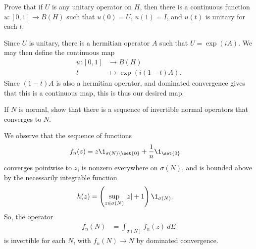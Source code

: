 \documentclass[10pt]{mypackage}
\begin{document}
\begin{problem}
  Prove that if $U$ is any unitary operator on $H$, then there is a continuous function $u\colon [0,1]\rightarrow B(H)$ such that $u(0) = U$, $u(1) = I$, and $u(t)$ is unitary for each $t$.
\end{problem}
\begin{solution}
  Since $U$ is unitary, there is a hermitian operator $A$ such that $U = \exp(iA)$. We may then define the continuous map
  \begin{align*}
    u\colon [0,1] &\rightarrow B(H)\\
    t &\mapsto \exp\left( i\left( 1-t \right)A \right).
  \end{align*}
  Since $\left( 1-t \right)A$ is also a hermitian operator, and dominated convergence gives that this is a continuous map, this is thus our desired map.
\end{solution}
\begin{problem}
  If $N$ is normal, show that there is a sequence of invertible normal operators that converges to $N$.
\end{problem}
\begin{solution}
  We observe that the sequence of functions
  \begin{align*}
    f_n(z) &= z\1_{\sigma(N)\setminus \set{0}} + \frac{1}{n}\1_{\set{0}}
  \end{align*}
  converges pointwise to $z$, is nonzero everywhere on $\sigma(N)$, and is bounded above by the necessarily integrable function
  \begin{align*}
    h(z) &= \left( \sup_{z\in \sigma(N)}\left\vert z \right\vert + 1 \right)\1_{\sigma(N)}.
  \end{align*}
  So, the operator
  \begin{align*}
    f_n(N) &= \int_{\sigma(N)}^{} f_n(z)\:dE
  \end{align*}
  is invertible for each $N$, with $f_n(N)\rightarrow N$ by dominated convergence.
\end{solution}
\printbibliography
\end{document}
